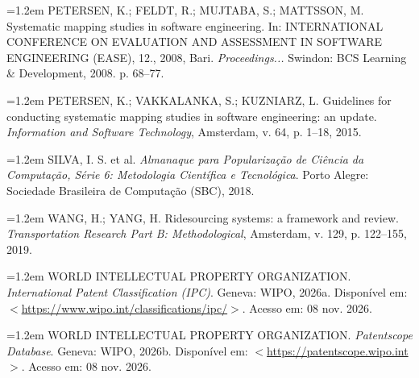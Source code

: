 \documentclass[12pt,a4paper]{article}
\begin{document}
\hangindent=1.2em PETERSEN, K.; FELDT, R.; MUJTABA, S.; MATTSSON, M. Systematic mapping studies in software engineering. In: INTERNATIONAL CONFERENCE ON EVALUATION AND ASSESSMENT IN SOFTWARE ENGINEERING (EASE), 12., 2008, Bari. \textit{Proceedings...} Swindon: BCS Learning \& Development, 2008. p. 68--77.

\hangindent=1.2em PETERSEN, K.; VAKKALANKA, S.; KUZNIARZ, L. Guidelines for conducting systematic mapping studies in software engineering: an update. \textit{Information and Software Technology}, Amsterdam, v. 64, p. 1--18, 2015.

\hangindent=1.2em SILVA, I. S. et al. \textit{Almanaque para Popularização de Ciência da Computação, Série 6: Metodologia Científica e Tecnológica}. Porto Alegre: Sociedade Brasileira de Computação (SBC), 2018.

\hangindent=1.2em WANG, H.; YANG, H. Ridesourcing systems: a framework and review. \textit{Transportation Research Part B: Methodological}, Amsterdam, v. 129, p. 122--155, 2019.

\hangindent=1.2em WORLD INTELLECTUAL PROPERTY ORGANIZATION. \textit{International Patent Classification (IPC)}. Geneva: WIPO, 2026a. Disponível em: $<$\url{https://www.wipo.int/classifications/ipc/}$>$. Acesso em: 08 nov. 2026.

\hangindent=1.2em WORLD INTELLECTUAL PROPERTY ORGANIZATION. \textit{Patentscope Database}. Geneva: WIPO, 2026b. Disponível em: $<$\url{https://patentscope.wipo.int}$>$. Acesso em: 08 nov. 2026.

\endgroup
\end{document}
